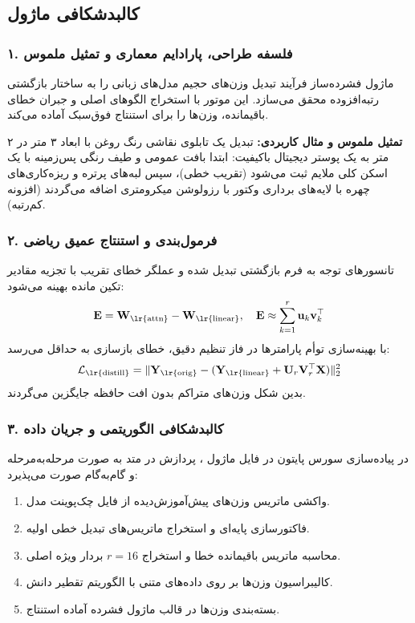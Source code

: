 \subsection{کالبدشکافی ماژول }

\subsubsection*{۱. فلسفه طراحی، پارادایم معماری و تمثیل ملموس}
ماژول فشرده‌ساز  فرآیند تبدیل وزن‌های حجیم مدل‌های زبانی را به ساختار بازگشتی رتبه‌افزوده محقق می‌سازد. این موتور با استخراج الگوهای اصلی و جبران خطای باقیمانده، وزن‌ها را برای استنتاج فوق‌سبک آماده می‌کند.

\textbf{تمثیل ملموس و مثال کاربردی:}
تبدیل یک تابلوی نقاشی رنگ روغن با ابعاد ۳ متر در ۲ متر به یک پوستر دیجیتال باکیفیت: ابتدا بافت عمومی و طیف رنگی پس‌زمینه با یک اسکن کلی ملایم ثبت می‌شود (تقریب خطی)، سپس لبه‌های پرتره و ریزه‌کاری‌های چهره با لایه‌های برداری وکتور با رزولوشن میکرومتری اضافه می‌گردند (افزونه کم‌رتبه).

\subsubsection*{۲. فرمول‌بندی و استنتاج عمیق ریاضی }
تانسورهای توجه به فرم بازگشتی تبدیل شده و عملگر خطای تقریب با تجزیه مقادیر تکین مانده بهینه می‌شود:
\begin{equation}
\mathbf{E} = \mathbf{W}_{\text{\lr{attn}}} - \mathbf{W}_{\text{\lr{linear}}}, \quad \mathbf{E} \approx \sum_{k=1}^r \mathbf{u}_k \mathbf{v}_k^\top
\end{equation}
با بهینه‌سازی توأم پارامترها در فاز تنظیم دقیق، خطای بازسازی به حداقل می‌رسد:
\begin{equation}
\mathcal{L}_{\text{\lr{distill}}} = \|\mathbf{Y}_{\text{\lr{orig}}} - (\mathbf{Y}_{\text{\lr{linear}}} + \mathbf{U}_r \mathbf{V}_r^\top \mathbf{X})\|_2^2
\end{equation}
بدین شکل وزن‌های متراکم بدون افت حافظه جایگزین می‌گردند.

\subsubsection*{۳. کالبدشکافی الگوریتمی و جریان داده }
در پیاده‌سازی سورس پایتون در فایل ماژول ، پردازش در متد  به صورت مرحله‌به‌مرحله و گام‌به‌گام صورت می‌پذیرد:
\begin{enumerate}
\item واکشی ماتریس وزن‌های پیش‌آموزش‌دیده از فایل چک‌پوینت مدل.
\item فاکتورسازی پایه‌ای و استخراج ماتریس‌های تبدیل خطی اولیه.
\item محاسبه ماتریس باقیمانده خطا و استخراج $r=16$ بردار ویژه اصلی.
\item کالیبراسیون وزن‌ها بر روی داده‌های متنی با الگوریتم تقطیر دانش.
\item بسته‌بندی وزن‌ها در قالب ماژول فشرده آماده استنتاج.
\end{enumerate}

